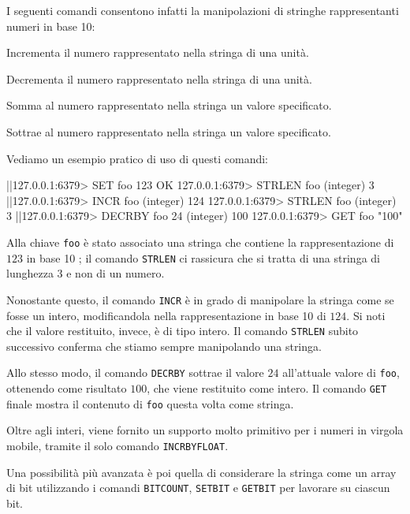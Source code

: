 I seguenti comandi consentono infatti la manipolazioni di stringhe rappresentanti numeri in base
10:

\begin{description}[style=nextline,font={\bfseries\ttfamily}]
	\item[INCR <key>] Incrementa il numero rappresentato nella stringa di una unità.
	\item[DECR <key>] Decrementa il numero rappresentato nella stringa di una unità.
	\item[INCRBY <key> <val>] Somma al numero rappresentato nella stringa un valore
	spe\-ci\-fi\-ca\-to.
	\item[DECRBY <key> <val>] Sottrae al numero rappresentato nella stringa un valore
	spe\-ci\-fi\-ca\-to.
\end{description}

Vediamo un esempio pratico di uso di questi comandi:

\begin{commentedsource}[style=redis]
|\lnote|127.0.0.1:6379> SET foo 123
OK
127.0.0.1:6379> STRLEN foo
(integer) 3
|\lnote|127.0.0.1:6379> INCR foo
(integer) 124
127.0.0.1:6379> STRLEN foo
(integer) 3
|\lnote|127.0.0.1:6379> DECRBY foo 24
(integer) 100
127.0.0.1:6379> GET foo
"100"
\end{commentedsource}

Alla chiave \verb|foo| è stato associato una stringa che contiene la rappresentazione di $123$
in base 10 ; il comando \verb|STRLEN| ci rassicura che si tratta di una stringa di
lunghezza $3$ e non di un numero.

Nonostante questo, il comando \verb|INCR|  è in grado di manipolare la stringa come
se fosse un intero, modificandola nella rappresentazione in base 10 di $124$. Si noti che il
valore restituito, invece, è di tipo intero. Il comando \verb|STRLEN| subito successivo conferma
che stiamo sempre manipolando una stringa.

Allo stesso modo, il comando \verb|DECRBY|  sottrae il valore $24$ all'attuale valore
di \verb|foo|, ottenendo come risultato $100$, che viene restituito come intero. Il comando
\verb|GET| finale mostra il contenuto di \verb|foo| questa volta come stringa.

Oltre agli interi, viene fornito un supporto molto primitivo per i numeri in virgola
mobile, tramite il solo comando \verb|INCRBYFLOAT|. 

Una possibilità più avanzata è poi quella di considerare la stringa come un array di bit utilizzando
i comandi \verb|BITCOUNT|, \verb|SETBIT| e \verb|GETBIT| per lavorare su ciascun bit.

